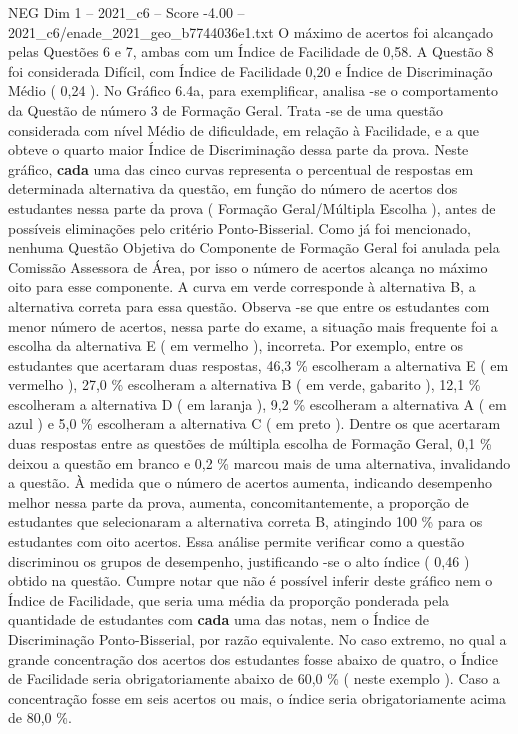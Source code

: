\begin{textsample}{NEG Dim 1 – 2021\_c6 – Score -4.00 – 2021\_c6/enade\_2021\_geo\_b7744036e1.txt}
O máximo de acertos foi alcançado pelas Questões 6 e 7, ambas com um Índice de Facilidade de 0,58.
A Questão 8 foi considerada Difícil, com Índice de Facilidade 0,20 e Índice de Discriminação Médio ( 0,24 ).
No Gráfico 6.4a, para exemplificar, analisa -se o comportamento da Questão de número 3 de Formação Geral.
Trata -se de uma questão considerada com nível Médio de dificuldade, em relação à Facilidade, e a que obteve o quarto maior Índice de Discriminação dessa parte da prova.
Neste gráfico, \textbf{cada} uma das cinco curvas representa o percentual de respostas em determinada alternativa da questão, em função do número de acertos dos estudantes nessa parte da prova ( Formação Geral/Múltipla Escolha ), antes de possíveis eliminações pelo critério Ponto-Bisserial.
Como já foi mencionado, nenhuma Questão Objetiva do Componente de Formação Geral foi anulada pela Comissão Assessora de Área, por isso o número de acertos alcança no máximo oito para esse componente.
A curva em verde corresponde à alternativa B, a alternativa correta para essa questão.
Observa -se que entre os estudantes com menor número de acertos, nessa parte do exame, a situação mais frequente foi a escolha da alternativa E ( em vermelho ), incorreta.
Por exemplo, entre os estudantes que acertaram duas respostas, 46,3 \% escolheram a alternativa E ( em vermelho ), 27,0 \% escolheram a alternativa B ( em verde, gabarito ), 12,1 \% escolheram a alternativa D ( em laranja ), 9,2 \% escolheram a alternativa A ( em azul ) e 5,0 \% escolheram a alternativa C ( em preto ).
Dentre os que acertaram duas respostas entre as questões de múltipla escolha de Formação Geral, 0,1 \% deixou a questão em branco e 0,2 \% marcou mais de uma alternativa, invalidando a questão.
À medida que o número de acertos aumenta, indicando desempenho melhor nessa parte da prova, aumenta, concomitantemente, a proporção de estudantes que selecionaram a alternativa correta B, atingindo 100 \% para os estudantes com oito acertos.
Essa análise permite verificar como a questão discriminou os grupos de desempenho, justificando -se o alto índice ( 0,46 ) obtido na questão.
Cumpre notar que não é possível inferir deste gráfico nem o Índice de Facilidade, que seria uma média da proporção ponderada pela quantidade de estudantes com \textbf{cada} uma das notas, nem o Índice de Discriminação Ponto-Bisserial, por razão equivalente.
No caso extremo, no qual a grande concentração dos acertos dos estudantes fosse abaixo de quatro, o Índice de Facilidade seria obrigatoriamente abaixo de 60,0 \% ( neste exemplo ).
Caso a concentração fosse em seis acertos ou mais, o índice seria obrigatoriamente acima de 80,0 \%.

\end{textsample}
